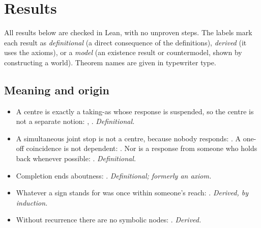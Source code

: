 \documentclass[11pt]{article}
\begin{document}
\section{Results}

All results below are checked in Lean, with no unproven steps. The labels mark each
result as \emph{definitional} (a direct consequence of the definitions), \emph{derived}
(it uses the axioms), or a \emph{model} (an existence result or countermodel, shown by
constructing a world). Theorem names are given in typewriter type.

\DeclareUrlCommand{}

\subsection{Meaning and origin}
\begin{itemize}
  \item A centre is exactly a taking-as whose response is suspended, so the centre is not a
    separate notion: , .
    \emph{Definitional.}
  \item A simultaneous joint stop is not a centre, because nobody responds:
    . A one-off coincidence is not dependent:
    . Nor is a response from someone who holds back
    whenever possible: . \emph{Definitional.}
  \item Completion ends aboutness: . \emph{Definitional;
    formerly an axiom.}
  \item Whatever a sign stands for was once within someone's reach:
    . \emph{Derived, by induction.}
  \item Without recurrence there are no symbolic nodes: .
    \emph{Derived.}
\end{itemize}
\end{document}
